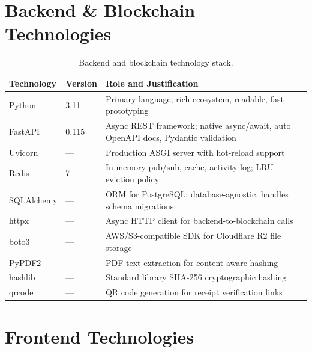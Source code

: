 \documentclass[12pt, a4paper]{report}
\begin{document}
\section{Backend \& Blockchain Technologies}

\begin{table}[H]
\centering
\begin{tabularx}{\textwidth}{l l X}
\toprule
\textbf{Technology} & \textbf{Version} & \textbf{Role and Justification} \\
\midrule
Python & 3.11 & Primary language; rich ecosystem, readable, fast prototyping \\
FastAPI & 0.115 & Async REST framework; native async/await, auto OpenAPI docs, Pydantic validation \\
Uvicorn & — & Production ASGI server with hot-reload support \\
Redis & 7 & In-memory pub/sub, cache, activity log; LRU eviction policy \\
SQLAlchemy & — & ORM for PostgreSQL; database-agnostic, handles schema migrations \\
httpx & — & Async HTTP client for backend-to-blockchain calls \\
boto3 & — & AWS/S3-compatible SDK for Cloudflare R2 file storage \\
PyPDF2 & — & PDF text extraction for content-aware hashing \\
hashlib & — & Standard library SHA-256 cryptographic hashing \\
qrcode & — & QR code generation for receipt verification links \\
\bottomrule
\end{tabularx}
\caption{Backend and blockchain technology stack.}
\end{table}

\section{Frontend Technologies}
\end{document}
